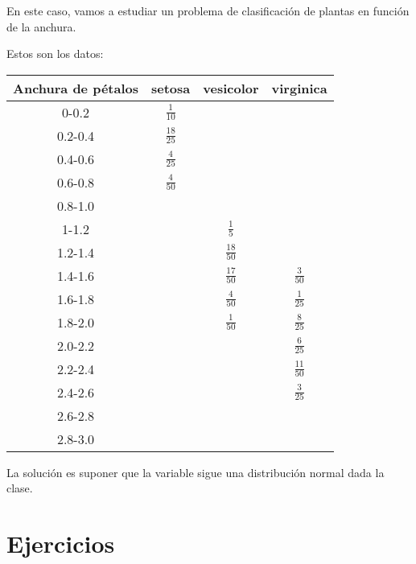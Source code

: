 \documentclass{apuntes}
\begin{document}
\begin{example}
En este caso, vamos a estudiar un problema de clasificación de plantas en función de la anchura.

Estos son los datos:

\begin{center}
\begin{tabular}{|c|c|c|c|}\hline
Anchura de pétalos & setosa & vesicolor & virginica \\[5pt]\hline\hline
0-0.2 & 	$\frac{1}{10}$ & & \\[5pt]\hline
0.2-0.4 & 	$\frac{18}{25}$ & & \\[5pt]\hline
0.4-0.6 & 	$\frac{4}{25}$ & & \\[5pt]\hline
0.6-0.8 & 	$\frac{4}{50}$ & & \\[5pt]\hline
0.8-1.0 & & &\\[5pt]\hline
1-1.2 &  & $\frac{1}{5}$ & \\[5pt]\hline
1.2-1.4 & 				 & $\frac{18}{50}$ & \\[5pt]\hline
1.4-1.6 & 				 & $\frac{17}{50}$ & $\frac{3}{50}$ \\[5pt]\hline
1.6-1.8 & 				 & $\frac{4}{50}$ &  $\frac{1}{25}$\\[5pt]\hline
1.8-2.0 & 				 & $\frac{1}{50}$ & $\frac{8}{25}$\\[5pt]\hline
2.0-2.2 & 				 & & $\frac{6}{25}$\\[5pt]\hline
2.2-2.4 & 				 & & $\frac{11}{50}$\\[5pt]\hline
2.4-2.6 & 				 & & $\frac{3}{25}$\\[5pt]\hline
2.6-2.8 & 				 & & \\[5pt]\hline
2.8-3.0 & 				 & & \\[5pt]\hline
\end{tabular}
\end{center}

La solución es suponer que la variable sigue una distribución normal dada la clase. 

\end{example}


\appendix

\chapter{Ejercicios}

\printindex
\end{document}
